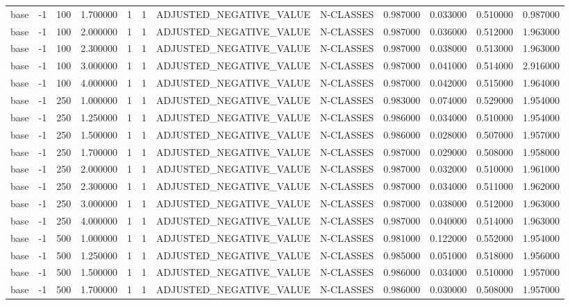 \begin{tabular}{lrrrllllrrrr}
base & -1 & 100 & 1.700000 & 1 & 1 & ADJUSTED_NEGATIVE_VALUE & N-CLASSES & 0.987000 & 0.033000 & 0.510000 & 0.987000 \\
base & -1 & 100 & 2.000000 & 1 & 1 & ADJUSTED_NEGATIVE_VALUE & N-CLASSES & 0.987000 & 0.036000 & 0.512000 & 1.963000 \\
base & -1 & 100 & 2.300000 & 1 & 1 & ADJUSTED_NEGATIVE_VALUE & N-CLASSES & 0.987000 & 0.038000 & 0.513000 & 1.963000 \\
base & -1 & 100 & 3.000000 & 1 & 1 & ADJUSTED_NEGATIVE_VALUE & N-CLASSES & 0.987000 & 0.041000 & 0.514000 & 2.916000 \\
base & -1 & 100 & 4.000000 & 1 & 1 & ADJUSTED_NEGATIVE_VALUE & N-CLASSES & 0.987000 & 0.042000 & 0.515000 & 1.964000 \\
base & -1 & 250 & 1.000000 & 1 & 1 & ADJUSTED_NEGATIVE_VALUE & N-CLASSES & 0.983000 & 0.074000 & 0.529000 & 1.954000 \\
base & -1 & 250 & 1.250000 & 1 & 1 & ADJUSTED_NEGATIVE_VALUE & N-CLASSES & 0.986000 & 0.034000 & 0.510000 & 1.954000 \\
base & -1 & 250 & 1.500000 & 1 & 1 & ADJUSTED_NEGATIVE_VALUE & N-CLASSES & 0.986000 & 0.028000 & 0.507000 & 1.957000 \\
base & -1 & 250 & 1.700000 & 1 & 1 & ADJUSTED_NEGATIVE_VALUE & N-CLASSES & 0.987000 & 0.029000 & 0.508000 & 1.958000 \\
base & -1 & 250 & 2.000000 & 1 & 1 & ADJUSTED_NEGATIVE_VALUE & N-CLASSES & 0.987000 & 0.032000 & 0.510000 & 1.961000 \\
base & -1 & 250 & 2.300000 & 1 & 1 & ADJUSTED_NEGATIVE_VALUE & N-CLASSES & 0.987000 & 0.034000 & 0.511000 & 1.962000 \\
base & -1 & 250 & 3.000000 & 1 & 1 & ADJUSTED_NEGATIVE_VALUE & N-CLASSES & 0.987000 & 0.038000 & 0.512000 & 1.963000 \\
base & -1 & 250 & 4.000000 & 1 & 1 & ADJUSTED_NEGATIVE_VALUE & N-CLASSES & 0.987000 & 0.040000 & 0.514000 & 1.963000 \\
base & -1 & 500 & 1.000000 & 1 & 1 & ADJUSTED_NEGATIVE_VALUE & N-CLASSES & 0.981000 & 0.122000 & 0.552000 & 1.954000 \\
base & -1 & 500 & 1.250000 & 1 & 1 & ADJUSTED_NEGATIVE_VALUE & N-CLASSES & 0.985000 & 0.051000 & 0.518000 & 1.956000 \\
base & -1 & 500 & 1.500000 & 1 & 1 & ADJUSTED_NEGATIVE_VALUE & N-CLASSES & 0.986000 & 0.034000 & 0.510000 & 1.957000 \\
base & -1 & 500 & 1.700000 & 1 & 1 & ADJUSTED_NEGATIVE_VALUE & N-CLASSES & 0.986000 & 0.030000 & 0.508000 & 1.957000 \\

\end{tabular}
